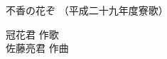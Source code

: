 \documentclass[10pt,b5j]{tarticle} %
\begin{document}
\begin{minipage}[c]{0.7\hsize} %
    \begin{center}
        {\LARGE
            不香の花ぞ %
        }
        {\small 
            （平成二十九年度寮歌） %
        }
    \end{center}
\end{minipage}
\begin{minipage}[c]{0.3\hsize} %
    \begin{flushright} %
        冠花君 作歌\\佐藤亮君 作曲 %
    \end{flushright}
\end{minipage}
\end{document}
